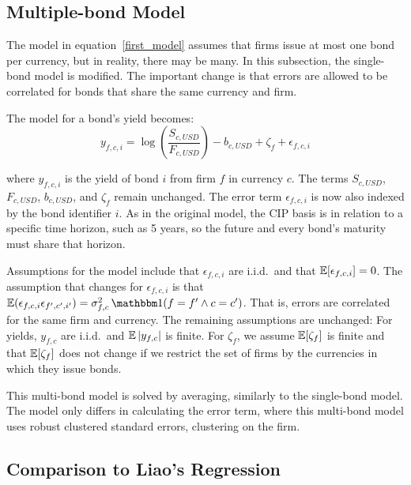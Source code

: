 \subsection{Multiple-bond Model}

The model in equation~\ref{first_model} assumes that firms issue at most one bond per currency, but in reality, there may be many.  In this subsection, the single-bond model is modified.  The important change is that errors are allowed to be correlated for bonds that share the same currency and firm.  


The model for a bond's yield becomes:
\begin{equation}
  \label{second_model}
 y_{f,c,i} = \log\left(\frac{S_{c,USD}}{F_{c,USD}}\right) - b_{c,USD} + \zeta_{f} + \epsilon_{f,c,i} 
\end{equation}

\noindent where $y_{f,c,i}$ is the yield of bond $i$ from firm $f$ in currency $c$.  The terms $S_{c,USD}$, $F_{c,USD}$, $b_{c,USD}$, and $\zeta_{f}$ remain unchanged.  The error term $\epsilon_{f,c,i}$ is now also indexed by the bond identifier $i$.   As in the original model, the CIP basis is in relation to a specific time horizon, such as 5 years, so the future and every bond's maturity must share that horizon.

Assumptions for the model include that $\epsilon_{f,c,i}$ are i.i.d.\ and that $\operatorname{\mathbb{E}}[\epsilon_{f,c,i}] = 0$.  The assumption that changes for $\epsilon_{f,c,i}$ is that $\E(\epsilon_{f,c,i}\epsilon_{f',c',i'}) = \sigma_{f,c}^2\ind(f=f' \land c=c')$.  That is, errors are correlated for the same firm and currency.  The remaining assumptions are unchanged:  For yields, $y_{f,c}$ are i.i.d.\ and $\operatorname{\mathbb{E}}|y_{f,c}|$ is finite.  For $\zeta_f$, we assume $\operatorname{\mathbb{E}}[\zeta_f]$ is finite and that $\operatorname{\mathbb{E}}[\zeta_f]$ does not change if we restrict the set of firms by the currencies in which they issue bonds.  

This multi-bond model is solved by averaging, similarly to the single-bond model.  The model only differs in calculating the error term, where this multi-bond model uses robust clustered standard errors, clustering on the firm.



\subsection{Comparison to Liao's Regression}

